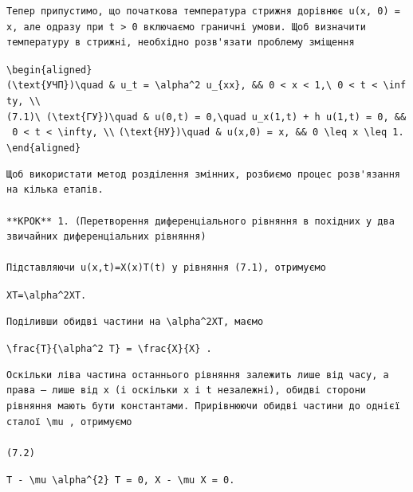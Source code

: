 \documentclass[
  ukrainian,
]{article}
\begin{document}
\begin{verbatim}
Тепер припустимо, що початкова температура стрижня дорівнює u(x, 0) = x, але одразу при t > 0 включаємо граничні умови. Щоб визначити температуру в стрижні, необхідно розв'язати проблему зміщення
\end{verbatim}

\texttt{\textbackslash{}begin\{aligned\}}
\texttt{(\textbackslash{}text\{УЧП\})\textbackslash{}quad\ \&\ u\_t\ =\ \textbackslash{}alpha\^{}2\ u\_\{xx\},\ \&\&\ 0\ \textless{}\ x\ \textless{}\ 1,\textbackslash{}\ 0\ \textless{}\ t\ \textless{}\ \textbackslash{}infty,\ \textbackslash{}\textbackslash{}}
\texttt{(7.1)\textbackslash{}\ (\textbackslash{}text\{ГУ\})\textbackslash{}quad\ \&\ u(0,t)\ =\ 0,\textbackslash{}quad\ u\_x(1,t)\ +\ h\ u(1,t)\ =\ 0,\ \&\&\ 0\ \textless{}\ t\ \textless{}\ \textbackslash{}infty,\ \textbackslash{}\textbackslash{}}
\texttt{(\textbackslash{}text\{НУ\})\textbackslash{}quad\ \&\ u(x,0)\ =\ x,\ \&\&\ 0\ \textbackslash{}leq\ x\ \textbackslash{}leq\ 1.}
\texttt{\textbackslash{}end\{aligned\}}

\begin{verbatim}
Щоб використати метод розділення змінних, розбиємо процес розв'язання на кілька етапів.

**КРОК** 1. (Перетворення диференціального рівняння в похідних у два звичайних диференціальних рівняння)

Підставляючи u(x,t)=X(x)T(t) у рівняння (7.1), отримуємо
\end{verbatim}

\texttt{XT\textquotesingle{}=\textbackslash{}alpha\^{}2X\textquotesingle{}\textquotesingle{}T.}

\begin{verbatim}
Поділивши обидві частини на \alpha^2XT, маємо
\end{verbatim}

\texttt{\textbackslash{}frac\{T\textquotesingle{}\}\{\textbackslash{}alpha\^{}2\ T\}\ =\ \textbackslash{}frac\{X\textquotesingle{}\textquotesingle{}\}\{X\}\ .}

\begin{verbatim}
Оскільки ліва частина останнього рівняння залежить лише від часу, а права — лише від x (і оскільки x і t незалежні), обидві сторони рівняння мають бути константами. Прирівнюючи обидві частини до однієї сталої \mu , отримуємо

(7.2)
\end{verbatim}

\texttt{T\textquotesingle{}\ -\ \textbackslash{}mu\ \textbackslash{}alpha\^{}\{2\}\ T\ =\ 0,\ X\textquotesingle{}\textquotesingle{}\ -\ \textbackslash{}mu\ X\ =\ 0.}
\end{document}

